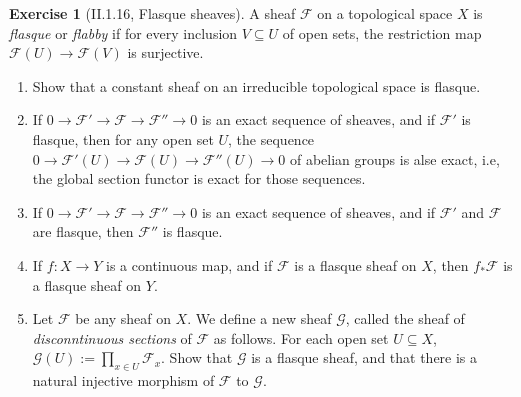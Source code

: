 \documentclass{article}
\theoremstyle{plain}
\theoremstyle{definition}
\newtheorem*{exer}{Exercise}
\begin{document}
\begin{exer}[II.1.16, Flasque sheaves]
    A sheaf $\mathscr{F}$ on a topological space $X$ is \emph{flasque} or \emph{flabby} if for every inclusion $V \subseteq U$ of open sets, the restriction map $\mathscr{F}(U) \to \mathscr{F}(V)$ is surjective.
    \begin{enumerate}
        \item Show that a constant sheaf on an irreducible topological space is flasque.
        \item If $0 \to \mathscr{F}' \to \mathscr{F} \to \mathscr{F}'' \to 0$ is an exact sequence of sheaves, and if $\mathscr{F}'$ is flasque, then for any open set $U$, the sequence $0 \to \mathscr{F}'(U) \to \mathscr{F}(U) \to \mathscr{F}''(U) \to 0$ of abelian groups is alse exact, i.e, the global section functor is exact for those sequences.
        \item If $0 \to \mathscr{F}' \to \mathscr{F} \to \mathscr{F}'' \to 0$ is an exact sequence of sheaves, and if $\mathscr{F}'$ and $\mathscr{F}$ are flasque, then $\mathscr{F}''$ is flasque.
        \item If $f:X \to Y$ is a continuous map, and if $\mathscr{F}$ is a flasque sheaf on $X$, then $f_\ast \mathscr{F}$ is a flasque sheaf on $Y$.
        \item Let $\mathscr{F}$ be any sheaf on $X$. We define a new sheaf $\mathscr{G}$, called the sheaf of \emph{disconntinuous sections} of $\mathscr{F}$ as follows. For each open set $U \subseteq X$, $\mathscr{G}(U) := \prod_{x \in U} \mathscr{F}_x$. Show that $\mathscr{G}$ is a flasque sheaf, and that there is a natural injective morphism of $\mathscr{F}$ to $\mathscr{G}$.
    \end{enumerate}
\end{exer}
\end{document}

